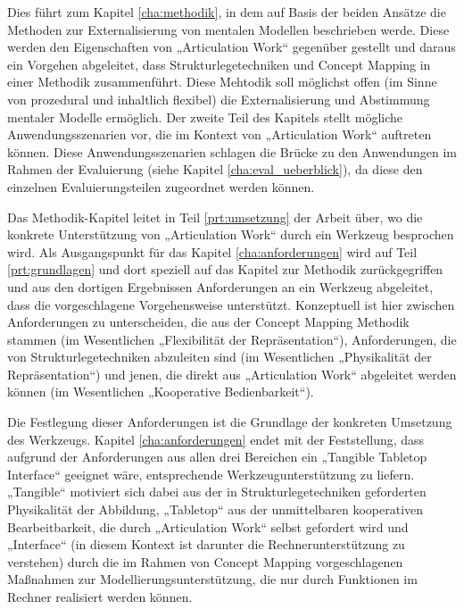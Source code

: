 Dies führt zum Kapitel \ref{cha:methodik}, in dem auf Basis der beiden Ansätze die Methoden zur Externalisierung von mentalen Modellen beschrieben werde. Diese werden den Eigenschaften von „Articulation Work“ gegenüber gestellt und daraus ein Vorgehen abgeleitet, dass Strukturlegetechniken und Concept Mapping in einer Methodik zusammenführt. Diese Mehtodik soll möglichst offen (im Sinne von prozedural und inhaltlich flexibel) die Externalisierung und Abstimmung mentaler Modelle ermöglich. Der zweite Teil des Kapitels stellt mögliche Anwendungsszenarien vor, die im Kontext von „Articulation Work“ auftreten können. Diese Anwendungsszenarien schlagen die Brücke zu den Anwendungen im Rahmen der Evaluierung (siehe Kapitel \ref{cha:eval_ueberblick}), da diese den einzelnen Evaluierungsteilen zugeordnet werden können.

Das Methodik-Kapitel leitet in Teil \ref{prt:umsetzung} der Arbeit über, wo die konkrete Unterstützung von „Articulation Work“ durch ein Werkzeug besprochen wird. Als Ausgangspunkt für das Kapitel \ref{cha:anforderungen} wird auf Teil \ref{prt:grundlagen} und dort speziell auf das Kapitel zur Methodik zurückgegriffen und aus den dortigen Ergebnissen Anforderungen an ein Werkzeug abgeleitet, dass die vorgeschlagene Vorgehensweise unterstützt. Konzeptuell ist hier zwischen Anforderungen zu unterscheiden, die aus der Concept Mapping Methodik stammen (im Wesentlichen „Flexibilität der Repräsentation“), Anforderungen, die von Strukturlegetechniken abzuleiten sind (im Wesentlichen „Physikalität der Repräsentation“) und jenen, die direkt aus „Articulation Work“ abgeleitet werden können (im Wesentlichen „Kooperative Bedienbarkeit“).

Die Festlegung dieser Anforderungen ist die Grundlage der konkreten Umsetzung des Werkzeugs. Kapitel \ref{cha:anforderungen} endet mit der Feststellung, dass aufgrund der Anforderungen aus allen drei Bereichen ein „Tangible Tabletop Interface“ geeignet wäre, entsprechende Werkzeugunterstützung zu liefern. „Tangible“ motiviert sich dabei aus der in Strukturlegetechniken geforderten Physikalität der Abbildung, „Tabletop“ aus der unmittelbaren kooperativen Bearbeitbarkeit, die durch „Articulation Work“ selbst gefordert wird und „Interface“ (in diesem Kontext ist darunter die Rechnerunterstützung zu verstehen) durch die im Rahmen von Concept Mapping vorgeschlagenen Maßnahmen zur Modellierungsunterstützung, die nur durch Funktionen im Rechner realisiert werden können.


